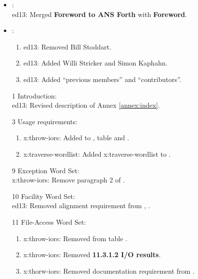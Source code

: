 	\begin{itemize}
	\item {}:							%
		~\\ \textsf{ed13}: Merged \textbf{Foreword to ANS Forth} with \textbf{Foreword}.

	\item {}:							%
		\begin{enumerate}
		\item \textsf{ed13}: Removed Bill Stoddart.
		\item \textsf{ed13}: Added Willi Stricker and Simon Kaphahn.
		\item \textsf{ed13}: Added ``previous members'' and ``contributors''.
		\end{enumerate}

	\item[1] Introduction:							%
		~ \\
		\textsf{ed13}: Revised description of Annex \ref{annex:index}.

	\item[3] Usage requirements:					%
		\begin{enumerate}
		\item \textsf{x:throw-iors}:
			Added  to , table 
			and .
		\item \textsf{x:traverse-wordlist}:
			Added \textsf{x:traverse-wordlist} to .
		\end{enumerate}

	\item[9] Exception Word Set:					%
		~ \\
		\textsf{x:throw-iors}: Remove paragraph 2 of .

	\item[10] Facility Word Set:					%
		~ \\
		\textsf{ed13}: Removed alignment requirement from , .

	\item[11] File-Access Word Set:				%
		\begin{enumerate}
		\item \textsf{x:throw-iors}: Removed  from table .
		\item \textsf{x:throw-iors}: Removed \textbf{11.3.1.2 I/O results}.
		\item \textsf{x:thorw-iors}: Removed  documentation requirement from .
		\end{enumerate}


\end{itemize}
